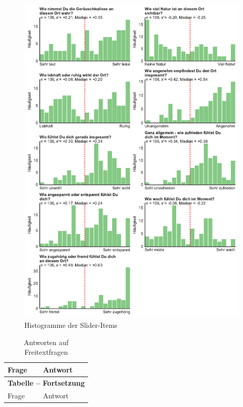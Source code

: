 \begin{appendices}
\begin{figure}[htbp]
    \centering
    \includegraphics[width=\textwidth]{analysis/plots/slider_hists.pdf}
    \caption{Histogramme der Slider-Items}
    \label{fig:slider_hists}
\end{figure}

\begin{longtable}{p{5.5cm}p{9.5cm}}
    \caption{Antworten auf Freitextfragen}
    \label{tab:freitext}\\
    \toprule
    Frage & Antwort \\
    \midrule
    \endfirsthead

    \multicolumn{2}{c}{{\bfseries Tabelle \thetable{} -- Fortsetzung}} \\
    \toprule
    Frage & Antwort \\
    \midrule
    \endhead
    

\end{longtable}
\end{appendices}
